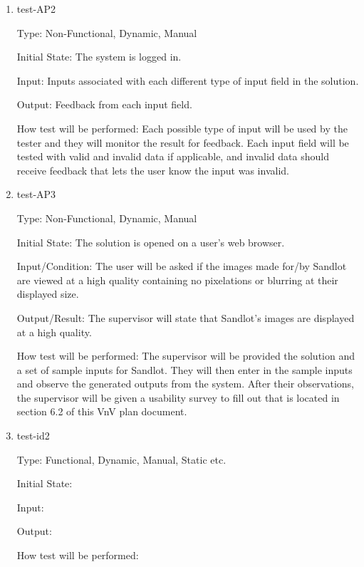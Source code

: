 \documentclass[12pt, titlepage]{article}
\begin{document}
\begin{enumerate}

  \item{test-AP2\\}

  Type: Non-Functional, Dynamic, Manual

  Initial State: The system is logged in.

  Input: Inputs associated with each different type of input field in the
  solution.

  Output: Feedback from each input field.

  How test will be performed: Each possible type of input will be used by the
  tester and they will monitor the result for feedback. Each input field will
  be tested with valid and invalid data if applicable, and invalid data should
  receive feedback that lets the user know the input was invalid.

\item{test-AP3\\}

Type: Non-Functional, Dynamic, Manual
					
Initial State: The solution is opened on a user's web browser.
					
Input/Condition: The user will be asked if the images made for/by Sandlot are viewed at
a high quality containing no pixelations or blurring at their displayed size.
					
Output/Result: The supervisor will state that Sandlot's images are displayed at a high
quality.
					
How test will be performed: The supervisor will be provided the solution and a set of
sample inputs for Sandlot. They will then enter in the sample inputs and observe the
generated outputs from the system. After their observations, the supervisor will be given
a usability survey to fill out that is located in section 6.2 of this VnV plan document.
					
\item{test-id2\\}

Type: Functional, Dynamic, Manual, Static etc.
					
Initial State: 
					
Input: 
					
Output: 
					
How test will be performed: 

\end{enumerate}
\end{document}
